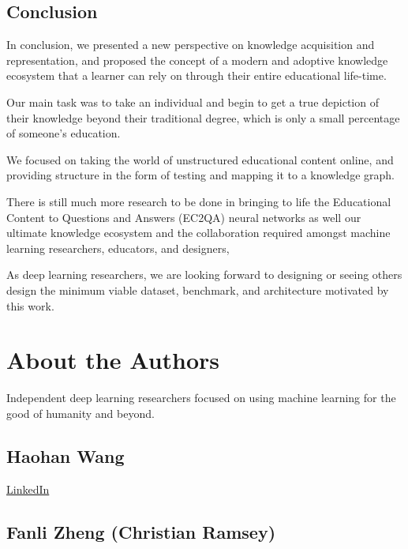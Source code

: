 \documentclass[]{book}
\theoremstyle{definition}
\theoremstyle{definition}
\theoremstyle{definition}
\theoremstyle{remark}
\begin{document}
\hypertarget{mce-responses}{}
\hypertarget{mce-error-response}{}

\hypertarget{mce-success-response}{}

\section{Conclusion}\label{conclusion}

In conclusion, we presented a new perspective on knowledge acquisition
and representation, and proposed the concept of a modern and adoptive
knowledge ecosystem that a learner can rely on through their entire
educational life-time.

Our main task was to take an individual and begin to get a true
depiction of their knowledge beyond their traditional degree, which is
only a small percentage of someone's education.

We focused on taking the world of unstructured educational content
online, and providing structure in the form of testing and mapping it to
a knowledge graph.

There is still much more research to be done in bringing to life the
Educational Content to Questions and Answers (EC2QA) neural networks as
well our ultimate knowledge ecosystem and the collaboration required
amongst machine learning researchers, educators, and designers,

As deep learning researchers, we are looking forward to designing or
seeing others design the minimum viable dataset, benchmark, and
architecture motivated by this work.

\chapter{About the Authors}\label{about-the-authors}

Independent deep learning researchers focused on using machine learning
for the good of humanity and beyond.

\section{Haohan Wang}\label{haohan-wang}

\href{https://www.linkedin.com/in/haohanw}{LinkedIn}

\section{Fanli Zheng (Christian
Ramsey)}\label{fanli-zheng-christian-ramsey}
\end{document}

